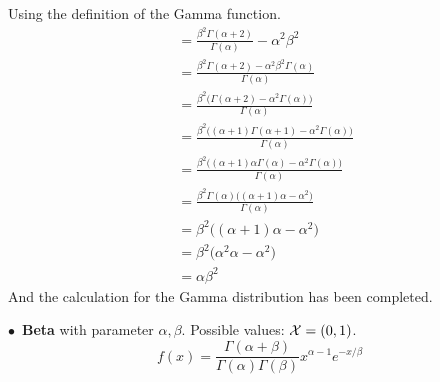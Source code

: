 \newpage\noindent
Using the definition of the Gamma function.
\begin{align*}
    &= \frac{\beta^{2}\Gamma(\alpha + 2)}{\Gamma(\alpha)} - \alpha^2\beta^2 \\
    &= \frac{\beta^{2}\Gamma(\alpha + 2) - \alpha^2\beta^2\Gamma(\alpha)}{\Gamma(\alpha)} \\
    &= \frac{\beta^{2}\big(\Gamma(\alpha + 2) - \alpha^2\Gamma(\alpha)\big)}{\Gamma(\alpha)} \\
    &= \frac{\beta^{2}\big((\alpha + 1)\Gamma(\alpha + 1) - \alpha^2\Gamma(\alpha)\big)}{\Gamma(\alpha)} \\
    &= \frac{\beta^{2}\big((\alpha + 1)\alpha\Gamma(\alpha) - \alpha^2\Gamma(\alpha)\big)}{\Gamma(\alpha)} \\
    &= \frac{\beta^{2}\Gamma(\alpha)\big((\alpha + 1)\alpha - \alpha^2\big)}{\Gamma(\alpha)} \\
    &= \beta^{2}\big((\alpha + 1)\alpha - \alpha^2\big)\\
    &= \beta^{2}\big(\alpha^2 \alpha - \alpha^2\big) \\
    &= \alpha\beta^2
\end{align*}
And the calculation for the Gamma distribution has been completed.

\bigskip\noindent$\bullet$ \textbf{Beta} with parameter $\alpha,\beta$. Possible values: $\mathcal{X} = (0,1)$. 
$$
f(x) = \frac{\Gamma(\alpha + \beta)}{\Gamma(\alpha)\Gamma(\beta)}x^{\alpha - 1}e^{-x/\beta}
$$




